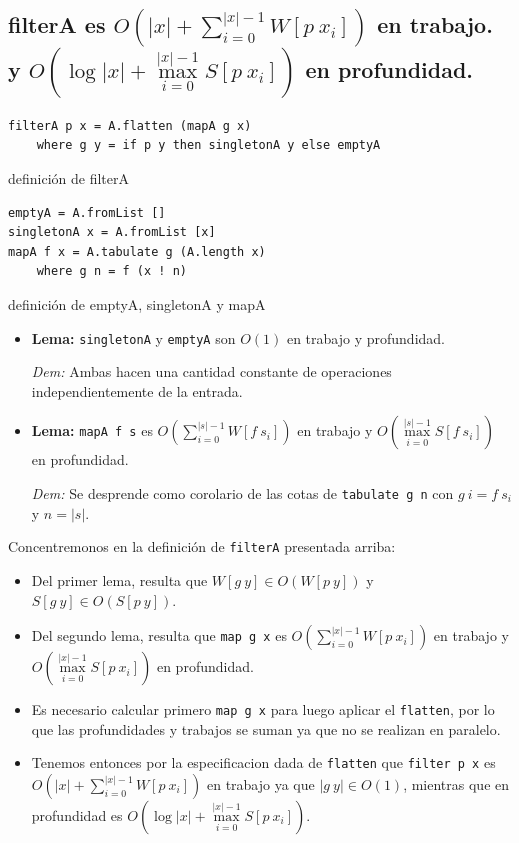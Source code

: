 \documentclass[12pt]{article}
\begin{document}
\subsection{filterA es $O(|x| + \sum\limits_{i=0}^{|x|-1} W[p\ x_i])$ en trabajo.\\ y $O(\log |x| + \max\limits_{i=0}^{|x|-1} S[p\ x_i])$ en profundidad.}
\begin{table}[h]
\begin{lstlisting}
filterA p x = A.flatten (mapA g x)
    where g y = if p y then singletonA y else emptyA
\end{lstlisting}
\caption{definición de filterA}
\end{table}
\begin{table}[h]
\begin{lstlisting}
emptyA = A.fromList []
singletonA x = A.fromList [x]
mapA f x = A.tabulate g (A.length x)
    where g n = f (x ! n)
\end{lstlisting}
\caption{definición de emptyA, singletonA y mapA}
\end{table}
\begin{itemize}
\item \textbf{Lema:} \texttt{singletonA} y \texttt{emptyA} son $O(1)$ en trabajo y profundidad.

 \textit{Dem:} Ambas hacen una cantidad constante de operaciones independientemente de la entrada.
 
\item \textbf{Lema:} \texttt{mapA f s} es $O( \sum\limits_{i=0}^{|s|-1} W[f\ s_i] )$ en trabajo y $O( \max\limits_{i=0}^{|s|-1} S[f\ s_i] )$ en profundidad.

 \textit{Dem:} Se desprende como corolario de las cotas de \texttt{tabulate g n} con $g\ i = f\ s_i$ y $n=|s|$. 
 
\end{itemize}

Concentremonos en la definición de \texttt{filterA} presentada arriba:
\begin{itemize}
\item Del primer lema, resulta que $W[g\ y]\in O(W[p\ y])$ y $S[g\ y]\in O(S[p\ y])$.
\item Del segundo lema, resulta que \texttt{map\ g\ x} es $O(\sum\limits_{i=0}^{|x|-1} W[p\ x_i])$ en trabajo y $O(\max\limits_{i=0}^{|x|-1} S[p\ x_i])$ en profundidad.
\item Es necesario calcular primero \texttt{map\ g\ x} para luego aplicar el \texttt{flatten}, por lo que las profundidades y trabajos se suman ya que no se realizan en paralelo.
\item Tenemos entonces por la especificacion dada de \texttt{flatten} que \texttt{filter\ p\ x} es $O(|x| + \sum\limits_{i=0}^{|x|-1} W[p\ x_i])$ en trabajo ya que $|g\ y| \in O(1)$, mientras que en profundidad es $O(\log |x| + \max\limits_{i=0}^{|x|-1} S[p\ x_i])$.
\end{itemize}
\end{document}
